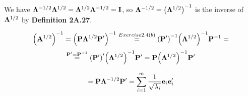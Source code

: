 \begin{enumerate}
            We have $\bold{\Lambda}^{-1/2}\bold{\Lambda}^{1/2} = \bold{\Lambda}^{1/2}\bold{\Lambda}^{-1/2} = \bold{I}$, so $\bold{\Lambda}^{-1/2} = {\left(\bold{\Lambda}^{1/2}\right)}^{-1}$ is the inverse of $\bold{\Lambda}^{1/2}$ by \textbf{Definition 2A.27}.

            \[
                {\left(\bold{A}^{1/2}\right)}^{-1}
                =
                {\left(\bold{P}\bold{\Lambda}^{1/2}\bold{P}^\prime\right)}^{-1}
                \overset{Exercise 2.4(b)}{=}
                {\left(\bold{P}^\prime\right)}^{-1}{\left(\bold{\Lambda}^{1/2}\right)}^{-1}\bold{P}^{-1} 
                =
            \]
            \[
                \overset{\bold{P}^\prime = \bold{P}^{-1}}{=}
                {\left(\bold{P}^\prime\right)}^\prime{\left(\bold{\Lambda}^{1/2}\right)}^{-1}\bold{P}^\prime
                =
                \bold{P}{\left(\bold{\Lambda}^{1/2}\right)}^{-1}\bold{P}^\prime
            \]

            \[
                =
                \bold{P}\bold{\Lambda}^{-1/2}\bold{P}^\prime
                =
                \sum_{i=1}^m{\frac{1}{\sqrt{\lambda_i}}\bold{e}_i\bold{e}_i^\prime}
            \]


\end{enumerate}
